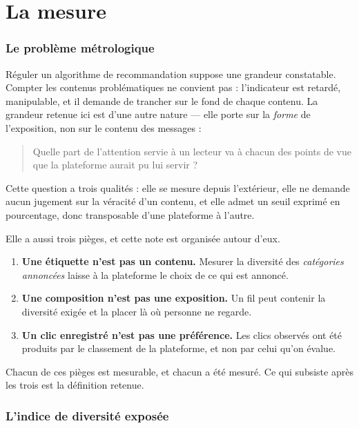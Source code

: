 \documentclass[11pt,a4paper]{article}
\begin{document}
\part{La mesure}
\label{part:mesure}

\section{Le problème métrologique}
\label{sec:probleme}

Réguler un algorithme de recommandation suppose une grandeur constatable. Compter les
contenus problématiques ne convient pas : l'indicateur est retardé, manipulable, et il
demande de trancher sur le fond de chaque contenu. La grandeur retenue ici est d'une autre
nature --- elle porte sur la \emph{forme} de l'exposition, non sur le contenu des messages :

\begin{quote}
Quelle part de l'attention servie à un lecteur va à chacun des points de vue que la
plateforme aurait pu lui servir ?
\end{quote}

Cette question a trois qualités : elle se mesure depuis l'extérieur, elle ne demande aucun
jugement sur la véracité d'un contenu, et elle admet un seuil exprimé en pourcentage, donc
transposable d'une plateforme à l'autre.

Elle a aussi trois pièges, et cette note est organisée autour d'eux.

\begin{enumerate}
\item \textbf{Une étiquette n'est pas un contenu.} Mesurer la diversité des \emph{catégories
      annoncées} laisse à la plateforme le choix de ce qui est annoncé.
\item \textbf{Une composition n'est pas une exposition.} Un fil peut contenir la diversité
      exigée et la placer là où personne ne regarde.
\item \textbf{Un clic enregistré n'est pas une préférence.} Les clics observés ont été
      produits par le classement de la plateforme, et non par celui qu'on évalue.
\end{enumerate}

Chacun de ces pièges est mesurable, et chacun a été mesuré. Ce qui subsiste après les trois
est la définition retenue.

\section{L'indice de diversité exposée}
\label{sec:indice}
\end{document}
